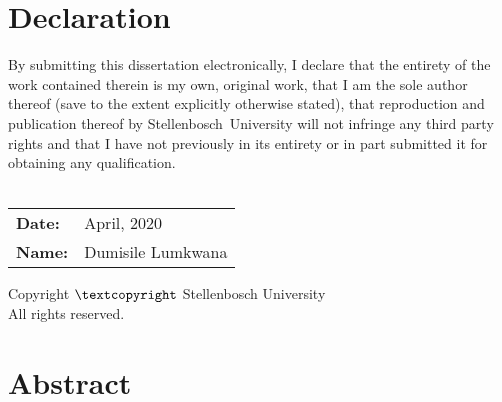 \TitlePage

\chapter{Declaration}
By submitting this dissertation electronically, I declare that the entirety of the work contained therein is my own, original work, that I am the sole author thereof (save to the extent explicitly otherwise stated), that reproduction and publication thereof by \mbox{Stellenbosch University} will not infringe any third party rights and that I have not \mbox{previously} in its entirety or in part submitted it for obtaining any qualification. \\ \\

\noindent
\begin{tabular}{@{}ll}
\textbf{Date:} & April, 2020 \\ 
\textbf{Name:} & Dumisile Lumkwana \\ 
\end{tabular}

\vspace*{\fill}
\begin{center}
Copyright $\textcopyright$ Stellenbosch University \\
All rights reserved.
\end{center}

\chapter{Abstract}

